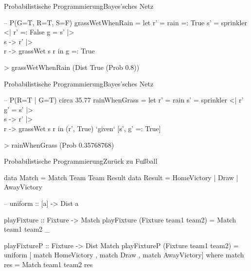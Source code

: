 \documentclass{beamer}
\begin{document}
\begin{frame}[fragile]{Probabilistische Programmierung}{Bayes'sches Netz}
\small
\begin{semiverbatim}
-- P(G=T, R=T, S=F)
grassWetWhenRain =
  let r' = rain =: True
      s' = sprinkler <| r' =: False
      g = s' |> \\s ->
          r' |> \\r ->
            grassWet s r
  in g =: True
\end{semiverbatim}
\vfill
\begin{semiverbatim}
> grassWetWhenRain
(Dist True (Prob 0.8))
\end{semiverbatim}
\vfill
\end{frame}

\begin{frame}[fragile]{Probabilistische Programmierung}{Bayes'sches Netz}
\small
\begin{semiverbatim}
-- P(R=T | G=T) circa 35.77 %
rainWhenGrass =
  let r' = rain
      s' = sprinkler <| r'
      g' = s' |> \\s ->
           r' |> \\r ->
             grassWet s r
  in (r', True) `given` [s', g' =: True]
\end{semiverbatim}
\vfill
\begin{semiverbatim}
> rainWhenGrass
(Prob 0.35768768)
\end{semiverbatim}
\vfill
\end{frame}


\begin{frame}[fragile]{Probabilistische Programmierung}{Zur\"uck zu Fu\ss{}ball}
\small
\begin{semiverbatim}
data Match = Match Team Team Result
data Result = HomeVictory | Draw | AwayVictory

-- uniform :: [a] -> Dist a
\end{semiverbatim}
  
\begin{semiverbatim}
playFixture :: Fixture -> Match
playFixture (Fixture team1 team2) =
  Match team1 team2 _

playFixtureP :: Fixture -> Dist Match
playFixtureP (Fixture team1 team2) =
  uniform [ match HomeVictory
          , match Draw
          , match AwayVictory]
 where match res = Match team1 team2 res
\end{semiverbatim}

\end{frame}
\end{document}
